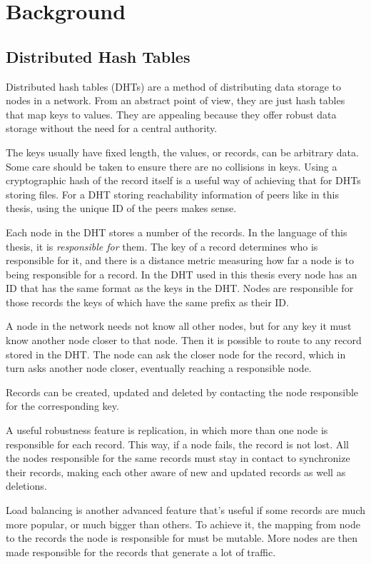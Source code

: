 \chapter{Background}
\label{chap:background}
\section{Distributed Hash Tables}
Distributed hash tables (DHTs) are a method of distributing data storage to
nodes in a network. From an abstract point of view, they are just hash tables
that map keys to values. They are appealing because they offer robust data
storage without the need for a central authority.

The keys usually have fixed length, the values, or records, can be arbitrary
data. Some care should be taken to ensure there are no collisions in keys. Using
a cryptographic hash of the record itself is a useful way of achieving that for
DHTs storing files. For a DHT storing reachability information of peers like in
this thesis, using the unique ID of the peers makes sense.

Each node in the DHT stores a number of the records. In the language of this
thesis, it is \emph{responsible for} them. The key of a record determines who is
responsible for it, and there is a distance metric measuring how far a node is
to being responsible for a record. In the DHT used in this thesis every node has
an ID that has the same format as the keys in the DHT. Nodes are responsible for
those records the keys of which have the same prefix as their ID.

A node in the network needs not know all other nodes, but for any key it must
know another node closer to that node. Then it is possible to route to any
record stored in the DHT. The node can ask the closer node for the record, which
in turn asks another node closer, eventually reaching a responsible node.

Records can be created, updated and deleted by contacting the node responsible
for the corresponding key.

A useful robustness feature is replication, in which more than one node is
responsible for each record. This way, if a node fails, the record is not lost.
All the nodes responsible for the same records must stay in contact to
synchronize their records, making each other aware of new and updated records as
well as deletions.

Load balancing is another advanced feature that's useful if some records are
much more popular, or much bigger than others. To achieve it, the mapping from
node to the records the node is responsible for must be mutable. More nodes are
then made responsible for the records that generate a lot of traffic.

